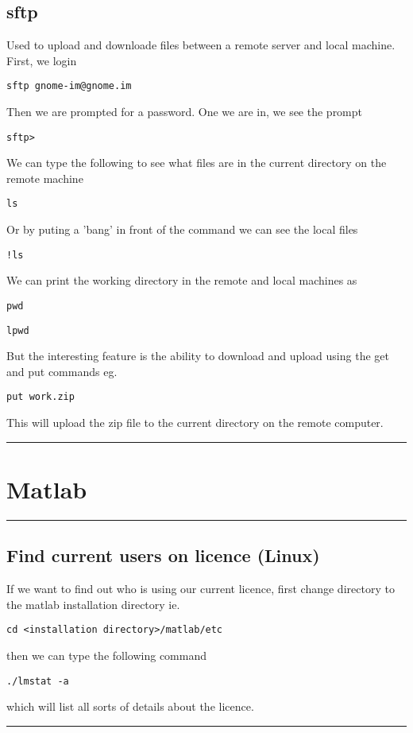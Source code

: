 \documentclass[a4paper, 10pt]{article}
\newcommand{\mytoprule}{\hrule\vspace{4mm}}
\newcommand{\mybotrule}{\vspace{4mm}\hrule}
\begin{document}
\subsection*{sftp}
Used to upload and downloade files between a remote server and local machine. First, we login
\begin{verbatim}
sftp gnome-im@gnome.im
\end{verbatim}
Then we are prompted for a password. One we are in, we see the prompt
\begin{verbatim}
sftp>
\end{verbatim}
We can type the following to see what files are in the current directory on the remote machine
\begin{verbatim}
ls
\end{verbatim}
Or by puting a 'bang' in front of the command we can see the local files
\begin{verbatim}
!ls
\end{verbatim}
We can print the working directory in the remote and local machines as
\begin{verbatim}
pwd
\end{verbatim}
\begin{verbatim}
lpwd
\end{verbatim}
But the interesting feature is the ability to download and upload using the get and put commands
eg.
\begin{verbatim}
put work.zip 
\end{verbatim}
This will upload the zip file to the current directory on the remote computer. 
\mybotrule

\vspace{10mm}
\section*{Matlab}

\mytoprule
\subsection*{Find current users on licence (Linux)}
If we want to find out who is using our current licence, first change directory to the matlab installation directory ie.
\begin{Verbatim}[commandchars=\\\{\}]
cd <installation directory>/matlab/etc
\end{Verbatim}
then we can type the following command 
\begin{Verbatim}[commandchars=\\\{\}]
./lmstat -a
\end{Verbatim}
which will list all sorts of details about the licence. 
\mybotrule
\end{document}
